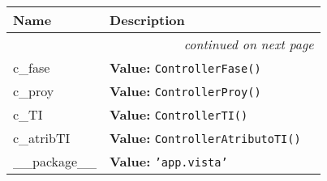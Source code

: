    \vspace{-1cm}
\hspace{\varindent}\begin{longtable}{|p{\varnamewidth}|p{\vardescrwidth}|l}
\cline{1-2}
\cline{1-2} \centering \textbf{Name} & \centering \textbf{Description}& \\
\cline{1-2}
\endhead\cline{1-2}\multicolumn{3}{r}{\small\textit{continued on next page}}\\\endfoot\cline{1-2}
\endlastfoot\raggedright c\-\_\-f\-a\-s\-e\- & \raggedright \textbf{Value:} 
{\tt ControllerFase()}&\\
\cline{1-2}
\raggedright c\-\_\-p\-r\-o\-y\- & \raggedright \textbf{Value:} 
{\tt ControllerProy()}&\\
\cline{1-2}
\raggedright c\-\_\-T\-I\- & \raggedright \textbf{Value:} 
{\tt ControllerTI()}&\\
\cline{1-2}
\raggedright c\-\_\-a\-t\-r\-i\-b\-T\-I\- & \raggedright \textbf{Value:} 
{\tt ControllerAtributoTI()}&\\
\cline{1-2}
\raggedright \_\-\_\-p\-a\-c\-k\-a\-g\-e\-\_\-\_\- & \raggedright \textbf{Value:} 
{\tt \texttt{'}\texttt{app.vista}\texttt{'}}&\\
\cline{1-2}
\end{longtable}

